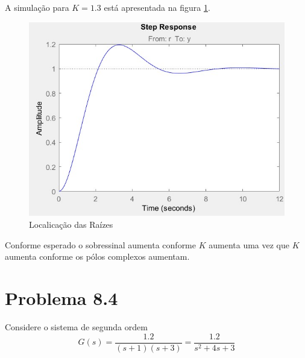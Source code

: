 \documentclass[
]{book}
\theoremstyle{definition}
\theoremstyle{definition}
\theoremstyle{definition}
\theoremstyle{remark}
\begin{document}
A simulação para \(K = 1.3\) está apresentada na figura \ref{fig:fig83c2}.

\begin{figure}

{\centering \includegraphics{Imagens/Lab8/Resolução/fig3c2} 

}

\caption{Localicação das Raízes}\label{fig:fig83c2}
\end{figure}

Conforme esperado o sobressinal aumenta conforme \(K\) aumenta uma vez que \(K\) aumenta conforme os pólos complexos aumentam.

\hypertarget{problema-8.4}{%
\section*{Problema 8.4}\label{problema-8.4}}

Considere o sistema de segunda ordem
\[
G(s) = \frac{1.2}{(s+1)(s+3)} = \frac{1.2}{s^2+4s+3}
\]
\end{document}
